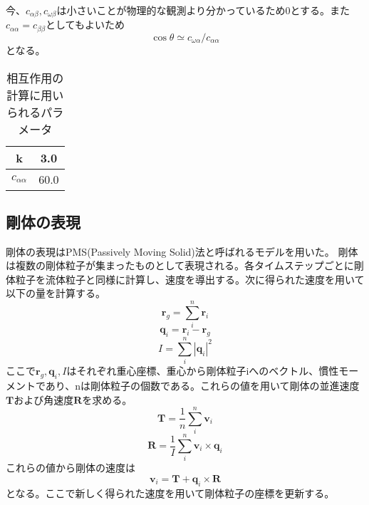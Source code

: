 \documentclass[]{jsarticle}
\begin{document}
今、$c_{\alpha\beta},c_{\omega\beta}$は小さいことが物理的な観測より分かっているため0とする。また$c_{\alpha\alpha}=c_{\beta\beta}$としてもよいため
\begin{equation}
\cos\theta\simeq c_{\omega\alpha}/c_{\alpha\alpha}
\end{equation}
となる。
\begin{table}[h]
  \caption{相互作用の計算に用いられるパラメータ}
  \label{interParam}
  \begin{center}
    \begin{tabular}{|c|c|}\hline
      k&3.0 \\ \hline
      $c_{\alpha\alpha}$ & 60.0 \\ \hline
    \end{tabular}
  \end{center}  
\end{table}

\subsection{剛体の表現}
剛体の表現はPMS(Passively Moving Solid)法\cite{Gotoh2018}と呼ばれるモデルを用いた。
剛体は複数の剛体粒子が集まったものとして表現される。各タイムステップごとに剛体粒子を流体粒子と同様に計算し、速度を導出する。次に得られた速度を用いて以下の量を計算する。
\begin{equation}
  \bm{r}_g=\sum_{i}^n{\bm{r}_i}
\end{equation}
\begin{equation}
  \bm{q}_i=\bm{r}_i-\bm{r}_g
\end{equation}
\begin{equation}
  I=\sum_{i}^n{|\bm{q}_i|^2}
\end{equation}
ここで$\bm{r}_g,\bm{q}_i,I$はそれぞれ重心座標、重心から剛体粒子iへのベクトル、慣性モーメントであり、nは剛体粒子の個数である。これらの値を用いて剛体の並進速度$\bm{T}$および角速度$\bm{R}$を求める。
\begin{equation}
  \bm{T}=\frac{1}{n}\sum_{i}^n{\bm{v}_i}
\end{equation}
\begin{equation}
  \bm{R}=\frac{1}{I}\sum_{i}^n{\bm{v}_i\times\bm{q}_i}
\end{equation}
これらの値から剛体の速度は
\begin{equation}
\bm{v}_i=\bm{T}+\bm{q}_i\times\bm{R}
\end{equation}
となる。ここで新しく得られた速度を用いて剛体粒子の座標を更新する。
\end{document}
